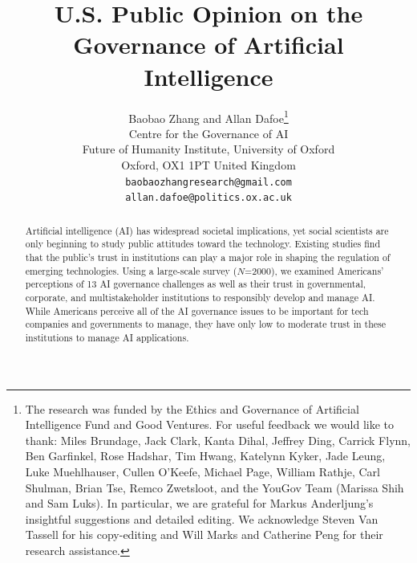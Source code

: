 \documentclass{article}
\begin{document}
\title{U.S. Public Opinion on the Governance of Artificial Intelligence}

\author{
 Baobao Zhang and Allan Dafoe\thanks{The research was funded by the Ethics and Governance of Artificial Intelligence Fund and Good Ventures. For useful feedback we would like to thank: Miles Brundage, Jack Clark, Kanta Dihal, Jeffrey Ding, Carrick Flynn, Ben Garfinkel, Rose Hadshar, Tim Hwang, Katelynn Kyker, Jade Leung, Luke Muehlhauser, Cullen O’Keefe, Michael Page, William Rathje, Carl Shulman, Brian Tse, Remco Zwetsloot, and the YouGov Team (Marissa Shih and Sam Luks). In particular, we are grateful for Markus Anderljung’s insightful suggestions and detailed editing. We acknowledge Steven Van Tassell for his copy-editing and Will Marks and Catherine Peng for their research assistance.} \\
  Centre for the Governance of AI\\
  Future of Humanity Institute, University of Oxford\\
Oxford, OX1 1PT United Kingdom \\
  \texttt{baobaozhangresearch@gmail.com} \\
  \texttt{allan.dafoe@politics.ox.ac.uk} \\
}

\maketitle

\begin{abstract}
Artificial intelligence (AI) has widespread societal implications, yet social scientists are only beginning to study public attitudes toward the technology. Existing studies find that the public's trust in institutions can play a major role in shaping the regulation of emerging technologies. Using a large-scale survey ($N$=2000), we examined Americans' perceptions of 13 AI governance challenges as well as their trust in governmental, corporate, and multistakeholder institutions to responsibly develop and manage AI. While Americans perceive all of the AI governance issues to be important for tech companies and governments to manage, they have only low to moderate trust in these institutions to manage AI applications. 
\end{abstract}
\end{document}
